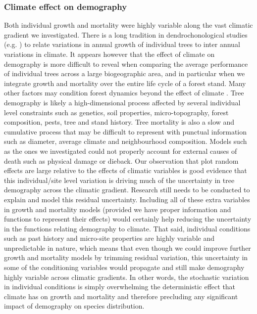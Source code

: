 \subsubsection{Climate effect on demography}
Both individual growth and mortality were highly variable along the vast climatic gradient we investigated. There is a long tradition in dendrochonological studies (e.g. \citet{Aussenac2017}) to relate variations in annual growth of individual trees to inter annual variations in climate. It appears however that the effect of climate on demography is more difficult to reveal when comparing the average performance of individual trees across a large biogeographic area, and in particular when we integrate growth and mortality over the entire life cycle of a forest stand. Many other factors may condition forest dynamics beyond the effect of climate \citep{Zhang2015}. Tree demography is likely a high-dimensional process \citep{Clark2011} affected by several individual level constraints such as genetics, soil properties, micro-topography, forest composition, pests, tree and stand history. Tree mortality is also a slow and cumulative process that may be difficult to represent with punctual information such as diameter, average climate and neighbourhood composition. Models such as the ones we investigated could not properly account for external causes of death such as physical damage \citep[uprooting, stem breakage, crushing by other falling trees]{Larson2010} or dieback. Our observation that plot random effects are large relative to the effects of climatic variables is good evidence that this individual/site level variation is driving much of the uncertainty in tree demography across the climatic gradient. Research still needs to be conducted to explain and model this residual uncertainty. Including all of these extra variables in growth and mortality models (provided we have proper information and functions to represent their effects) would certainly help reducing the uncertainty in the functions relating demography to climate. That said, individual conditions such as past history and micro-site properties are highly variable and unpredictable in nature, which means that even though we could improve further growth and mortality models by trimming residual variation, this uncertainty in some of the conditioning variables would propagate and still make demography highly variable across climatic gradients. In other words, the stochastic variation in individual conditions is simply overwhelming the deterministic effect that climate has on growth and mortality and therefore precluding any significant impact of demography on species distribution.

